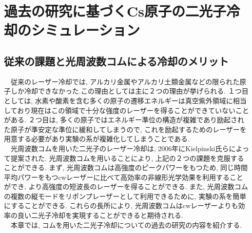 \documentclass[uplatex, dvipdfmx, a4paper, report, papersize, 11pt]{jsbook}
\begin{document}

\newpage
\chapter{過去の研究に基づくCs原子の二光子冷却のシミュレーション}
\section{従来の課題と光周波数コムによる冷却のメリット}

　従来のレーザー冷却では, アルカリ金属やアルカリ土類金属などの限られた原子しか冷却できなかった.この理由としては主に２つの理由が挙げられる. １つ目としては, 水素や酸素を含む多くの原子の遷移エネルギーは真空紫外領域に相当しており現在はこの領域で十分な強度のレーザーを得ることができていないことがある. ２つ目は, 多くの原子ではエネルギー準位の構造が複雑であり励起された原子が準安定な準位に緩和してしまうので, これを励起するためのレーザーを用意する必要があり実験の系が複雑化してしまうことである\cite{PhysRevA.73.063407}.\\
　光周波数コムを用いた二光子のレーザー冷却は, 2006年にKielpinski氏らによって提案された\cite{PhysRevA.73.063407}. 光周波数コムを用いることにより, 上記の２つの課題を克服することができる. まず, 光周波数コムは高強度のピークパワーをもつため, 同じ時間平均パワーをもつcwレーザーに比べて高効率の非線形光学効果を利用することができ, より高強度の短波長のレーザーを得ることができる. また, 光周波数コムの複数の縦モードをリポンプレーザーとして利用できるために, 実験の系を簡単にすることができる. これらの長所により, 光周波数コムはcwレーザーよりも効率の良い二光子冷却を実現することができると期待される\cite{PhysRevA.73.063407}.\\
　本章では, コムを用いた二光子冷却についての過去の研究の内容を紹介する.
\end{document}
